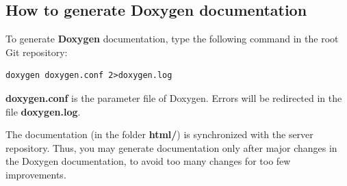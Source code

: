 \documentclass[english,a4paper,twoside]{article}
\begin{document}
\subsection{How to generate Doxygen documentation}
To generate \textbf{Doxygen} documentation, type the following command in the root Git repository:
\begin{verbatim}
doxygen doxygen.conf 2>doxygen.log
\end{verbatim}

\textbf{doxygen.conf} is the parameter file of Doxygen. Errors will be redirected in the file \textbf{doxygen.log}.

\begin{attention}
The documentation (in the folder \textbf{html/}) is synchronized with the server repository. Thus, you may generate documentation only after major changes in the Doxygen documentation, to avoid too many changes for too few improvements.
\end{attention}

\printindex
\end{document}
